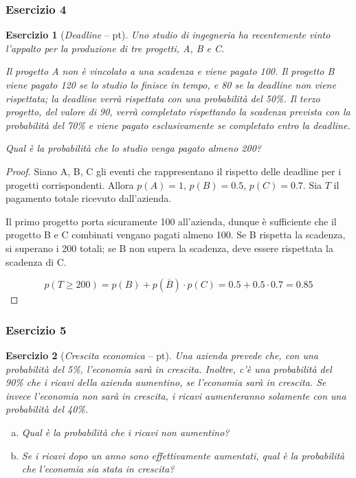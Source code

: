 \documentclass{beamer}
\newtheorem{exercise}{Esercizio}
\renewcommand\qedsymbol{$\blacksquare$}
\begin{document}
\begin{frame}[fragile]
	\frametitle{Esercizio 4}

	\begin{exercise}[\textit{Deadline} -- \pointsQd pt]
		Uno studio di ingegneria ha recentemente vinto l'appalto per la produzione di tre progetti, A, B e C.

		\medskip

		Il progetto A non è vincolato a una scadenza e viene pagato 100. Il progetto B viene pagato 120 se lo studio lo finisce in tempo, e 80 se la deadline non viene rispettata; la deadline verrà rispettata con una probabilità del 50\%. Il terzo progetto, del valore di 90, verrà completato rispettando la scadenza prevista con la probabilità del 70\% e viene pagato esclusivamente se completato entro la deadline.

		\medskip

		Qual è la probabilità che lo studio venga pagato almeno 200?
	\end{exercise}
\end{frame}

\begin{frame}[fragile]
	\begin{proof}%
		Siano A, B, C gli eventi che rappresentano il rispetto delle deadline per i progetti corrispondenti. Allora $p(A)=1$, $p(B)=0.5$, $p(C)=0.7$. Sia $T$ il pagamento totale ricevuto dall'azienda.

		\medskip

		Il primo progetto porta sicuramente 100 all'azienda, dunque è sufficiente che il progetto B e C combinati vengano pagati almeno 100. Se B rispetta la scadenza, si superano i 200 totali; se B non supera la scadenza, deve essere rispettata la scadenza di C.

		$$p(T\geq200)=p(B)+p(\overline{B})\cdot p(C)=0.5+0.5\cdot0.7=0.85$$
	\end{proof}
\end{frame}
\begin{frame}[fragile]
	\frametitle{Esercizio 5}

	\begin{exercise}[\textit{Crescita economica} -- \pointsQe pt]
		Una azienda prevede che, con una probabilità del 5\%, l'economia sarà in crescita. Inoltre, c'è una probabilità del 90\% che i ricavi della azienda aumentino, se l'economia sarà in crescita. Se invece l'economia non sarà in crescita, i ricavi aumenteranno solamente con una probabilità del 40\%.

		\begin{enumerate}[(a)]
			\item Qual è la probabilità che i ricavi non aumentino?
			\item Se i ricavi dopo un anno sono effettivamente aumentati, qual è la probabilità che l'economia sia stata in crescita?
		\end{enumerate}
	\end{exercise}
\end{frame}
\end{document}

